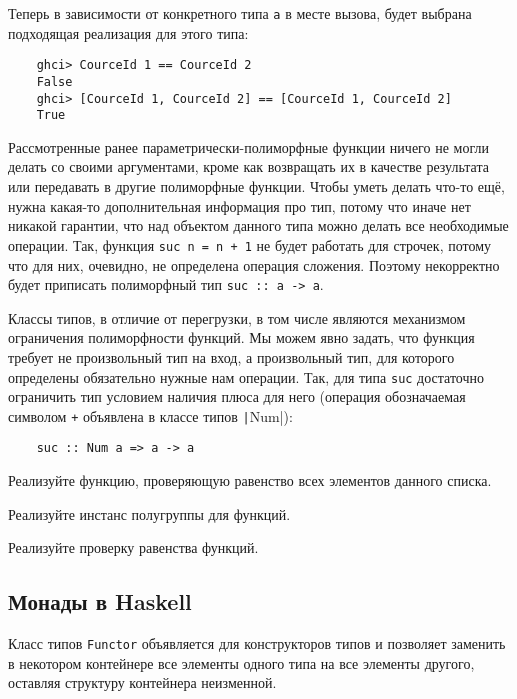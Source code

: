 Теперь в зависимости от конкретного типа \texttt{a} в месте вызова, будет выбрана подходящая реализация для этого типа:
\begin{verbatim}
    ghci> CourceId 1 == CourceId 2
    False
    ghci> [CourceId 1, CourceId 2] == [CourceId 1, CourceId 2]
    True
\end{verbatim}

Рассмотренные ранее параметрически-полиморфные функции ничего не могли делать со своими аргументами, кроме как возвращать их в качестве результата или передавать в другие полиморфные функции.
Чтобы уметь делать что-то ещё, нужна какая-то дополнительная информация про тип, потому что иначе нет никакой гарантии, что над объектом данного типа можно делать все необходимые операции.
Так, функция \texttt{suc n = n + 1} не будет работать для строчек, потому что для них, очевидно, не определена операция сложения.
Поэтому некорректно будет приписать полиморфный тип \texttt{suc :: a -> a}.

Классы типов, в отличие от перегрузки, в том числе являются механизмом ограничения полиморфности функций.
Мы можем явно задать, что функция требует не произвольный тип на вход, а произвольный тип, для которого определены обязательно нужные нам операции.
Так, для типа \texttt{suc} достаточно ограничить тип условием наличия плюса для него (операция обозначаемая символом \texttt{+} объявлена в классе типов \texttt|Num|):
\begin{verbatim}
    suc :: Num a => a -> a
\end{verbatim}

\begin{task}
    Реализуйте функцию, проверяющую равенство всех элементов данного списка.
\end{task}

\begin{task}
    Реализуйте инстанс полугруппы для функций.
\end{task}

\begin{task}
    Реализуйте проверку равенства функций.
\end{task}

\subsection{Монады в Haskell}

Класс типов \texttt{Functor} объявляется для конструкторов типов и позволяет заменить в некотором контейнере все элементы одного типа на все элементы другого, оставляя структуру контейнера неизменной.

